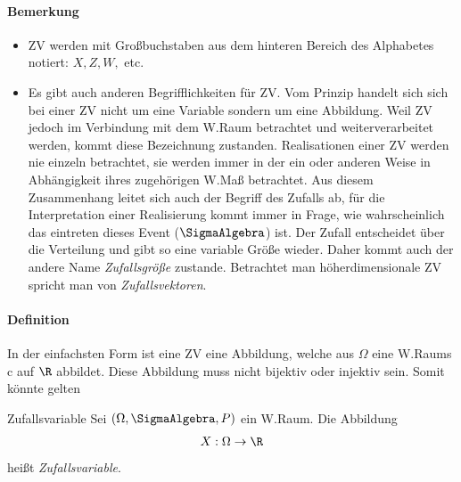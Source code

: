 \paragraph{Bemerkung}
\begin{itemize}
	\item \gls{ZV} werden mit Großbuchstaben aus dem hinteren Bereich des Alphabetes notiert: $X,Z,W,$ etc.
	\item Es gibt auch anderen Begrifflichkeiten für \gls{ZV}. Vom Prinzip handelt sich sich bei einer \gls{ZV} nicht um eine Variable sondern um eine Abbildung. Weil \gls{ZV} jedoch im Verbindung mit dem \gls{W.}Raum betrachtet und weiterverarbeitet werden, kommt diese Bezeichnung zustanden. Realisationen einer \gls{ZV} werden nie einzeln betrachtet, sie werden immer in der ein oder anderen Weise in Abhängigkeit ihres zugehörigen \gls{W.}Maß betrachtet. Aus diesem Zusammenhang leitet sich auch der Begriff des Zufalls ab, für die Interpretation einer Realisierung kommt immer in Frage, wie wahrscheinlich das eintreten dieses Event ($\SigmaAlgebra$) ist. Der Zufall entscheidet über die Verteilung und gibt so eine variable Größe wieder. Daher kommt auch der andere Name \textit{Zufallsgröße} zustande. Betrachtet man höherdimensionale \gls{ZV} spricht man von \textit{Zufallsvektoren}. 
\end{itemize}

\paragraph{Definition}
In der einfachsten Form ist eine \gls{ZV} eine Abbildung, welche aus $\Omega$ eine \gls{W.}Raums c auf $\R$ abbildet. Diese Abbildung muss nicht bijektiv oder injektiv sein. Somit könnte gelten
\begin{Definition}{Zufallsvariable}
	Sei $(\Omega, \SigmaAlgebra, P)$ ein \gls{W.}Raum. Die Abbildung
	\begin{align*}
		X: \Omega \rightarrow \R
	\end{align*}
	heißt \textit{Zufallsvariable}.
\end{Definition}

